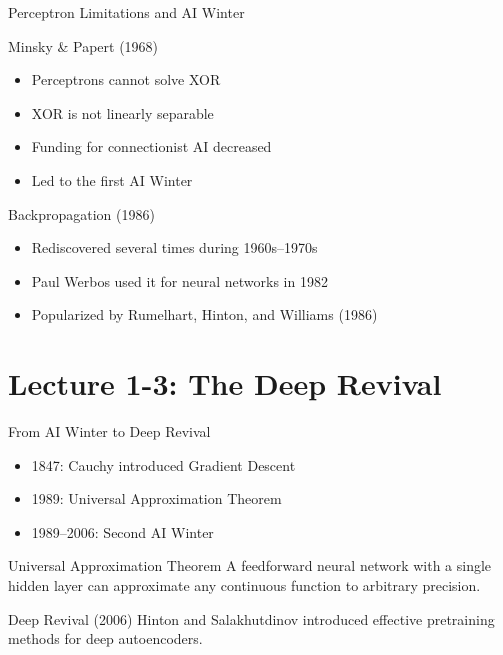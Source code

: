\documentclass{beamer}
\begin{document}

\begin{frame}{Perceptron Limitations and AI Winter}

\begin{alertblock}{Minsky \& Papert (1968)}
\begin{itemize}
\item Perceptrons cannot solve XOR
\item XOR is not linearly separable
\item Funding for connectionist AI decreased
\item Led to the first AI Winter
\end{itemize}
\end{alertblock}

\vspace{0.2cm}

\begin{block}{Backpropagation (1986)}
\begin{itemize}
\item Rediscovered several times during 1960s--1970s
\item Paul Werbos used it for neural networks in 1982
\item Popularized by Rumelhart, Hinton, and Williams (1986)
\end{itemize}
\end{block}

\end{frame}

\section{Lecture 1-3: The Deep Revival}

\begin{frame}{From AI Winter to Deep Revival}

\begin{itemize}
\item 1847: Cauchy introduced Gradient Descent
\item 1989: Universal Approximation Theorem
\item 1989--2006: Second AI Winter
\end{itemize}

\vspace{0.2cm}

\begin{block}{Universal Approximation Theorem}
A feedforward neural network with a single hidden layer can approximate any continuous function to arbitrary precision.
\end{block}

\vspace{0.2cm}

\begin{exampleblock}{Deep Revival (2006)}
Hinton and Salakhutdinov introduced effective pretraining methods for deep autoencoders.
\end{exampleblock}

\end{frame}
\end{document}
